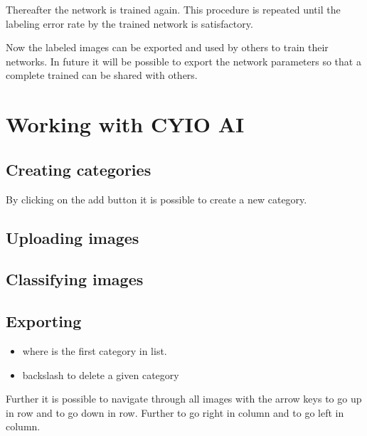 Thereafter the network is trained again. This procedure is 
repeated until the labeling error rate by the trained
network is satisfactory.

Now the labeled images can be exported and used by others
to train their networks. In future it will be possible to
export the network parameters so that a complete trained
can be shared with others.


\section{Working with CYIO AI}

\subsection{Creating categories}
By clicking on the add button it is possible to create a new
category.

\subsection{Uploading images}

\subsection{Classifying images}

\subsection{Exporting}



\begin{itemize}
	\item {}      
	   where  is the first category in list.
	\item \keystroke{$\Leftarrow$} backslash to delete a given category
\end{itemize}

Further it is possible to navigate through all images with the arrow keys \keystroke{$\Uparrow$} to go up in row and 
 \keystroke{$\Downarrow$} to go down in row. Further \keystroke{$\Rightarrow$} to go right in column and \keystroke{$\Leftarrow$} to go left in column.


